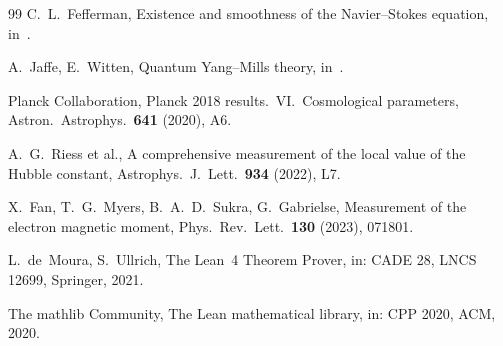 \documentclass[11pt,a4paper]{article}
\theoremstyle{definition}
\theoremstyle{remark}
\numberwithin{equation}{section}
\begin{document}
\begin{thebibliography}{99}
C.~L.~Fefferman,
Existence and smoothness of the Navier--Stokes equation,
in~\cite{clay2000}.

A.~Jaffe, E.~Witten,
Quantum Yang--Mills theory,
in~\cite{clay2000}.

Planck Collaboration,
Planck 2018 results.\ VI.\ Cosmological parameters,
Astron.\ Astrophys.\ \textbf{641} (2020), A6.

A.~G.~Riess et al.,
A comprehensive measurement of the local value of the Hubble constant,
Astrophys.\ J.\ Lett.\ \textbf{934} (2022), L7.

X.~Fan, T.~G.~Myers, B.~A.~D.~Sukra, G.~Gabrielse,
Measurement of the electron magnetic moment,
Phys.\ Rev.\ Lett.\ \textbf{130} (2023), 071801.

L.~de~Moura, S.~Ullrich,
The Lean~4 Theorem Prover,
in: CADE 28, LNCS 12699, Springer, 2021.

The mathlib Community,
The Lean mathematical library,
in: CPP 2020, ACM, 2020.

\end{thebibliography}
\end{document}
